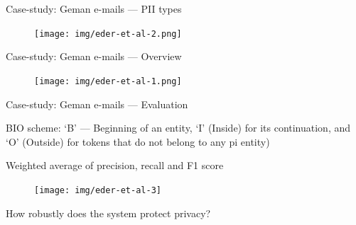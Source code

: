\documentclass[12pt,aspectratio=169,handout]{beamer}
\begin{document}
\begin{frame}{Case-study: Geman e-mails --- PII types}

\begin{figure}
\texttt{[image: img/eder-et-al-2.png]}
\end{figure}


\end{frame}

\begin{frame}{Case-study: Geman e-mails --- Overview}

\begin{figure}
\texttt{[image: img/eder-et-al-1.png]}
\end{figure}


\end{frame}


\begin{frame}{Case-study: Geman e-mails --- Evaluation}

BIO scheme: `B' --- Beginning of an entity, `I' (Inside) for its continuation, and ‘O’ (Outside) for tokens that do not belong to any pi entity)

Weighted average of precision, recall and F1 score

\begin{figure}
\texttt{[image: img/eder-et-al-3]}
\end{figure}

How robustly does the system protect privacy?


\end{frame}
\end{document}
